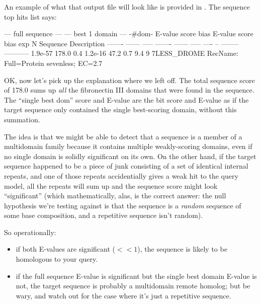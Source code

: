 An example of what that output file will look like is provided in
. The sequence top hits list says:

\begin{sreoutput}
   --- full sequence ---   --- best 1 domain ---    -#dom-
    E-value  score  bias    E-value  score  bias    exp  N  Sequence    Description
    ------- ------ -----    ------- ------ -----   ---- --  --------    -----------
    1.9e-57  178.0   0.4    1.2e-16   47.2   0.7    9.4  9  7LESS_DROME RecName: Full=Protein sevenless;          EC=2.7
\end{sreoutput}

OK, now let's pick up the explanation where we left off. The total
sequence score of 178.0 sums up \emph{all} the fibronectin III domains
that were found in the  sequence. The ``single best
dom'' score and E-value are the bit score and E-value as if the target
sequence only contained the single best-scoring domain, without this
summation.

The idea is that we might be able to detect that a sequence is a
member of a multidomain family because it contains multiple
weakly-scoring domains, even if no single domain is solidly
significant on its own.  On the other hand, if the target sequence
happened to be a piece of junk consisting of a set of identical
internal repeats, and one of those repeats accidentially gives a weak
hit to the query model, all the repeats will sum up and the sequence
score might look ``significant'' (which mathematically, alas, is the
correct answer: the null hypothesis we're testing against is that the
sequence is a \emph{random} sequence of some base composition, and a
repetitive sequence isn't random).

So operationally:
\begin{itemize}
\item if both E-values are significant ($<<1$), the sequence is likely
      to be homologous to your query.
\item if the full sequence E-value is significant but the single best domain
      E-value is not, the target sequence is probably a multidomain remote 
      homolog; but be wary, and watch out for the case where it's just a repetitive
      sequence.
\end{itemize}

